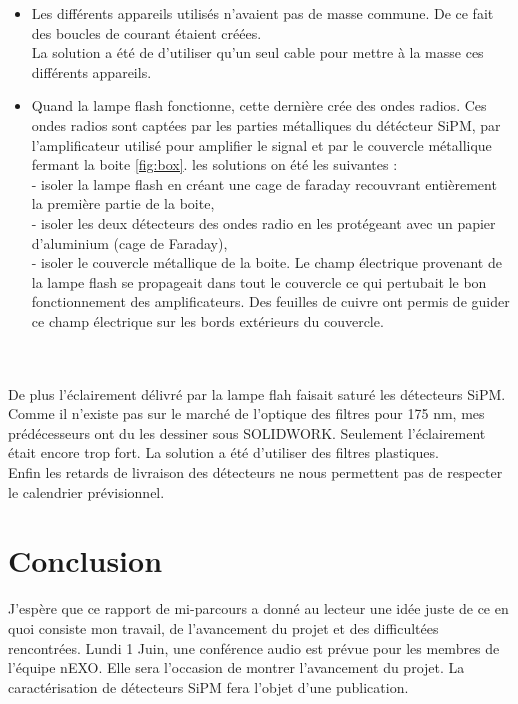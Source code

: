 \documentclass[a4paper, 11pt]{report}%
\begin{document}
  \begin{itemize}
    \item Les diff\'erents appareils utilis\'es n'avaient pas de masse commune. De ce fait des boucles de courant \'etaient cr\'e\'ees. 
    \\
    La solution a \'et\'e de d'utiliser qu'un seul cable pour mettre \`a la masse ces diff\'erents appareils. 
    \item Quand la lampe flash fonctionne, cette derni\`ere cr\'ee des ondes radios. Ces ondes radios sont capt\'ees par les parties m\'etalliques du d\'et\'ecteur SiPM,
    par l'amplificateur utilis\'e pour amplifier le signal et par le couvercle m\'etallique fermant la boite \ref{fig:box}.
    les solutions on \'et\'e les suivantes : 
    \\- isoler la lampe flash en cr\'eant une cage de faraday recouvrant enti\`erement la premi\`ere partie de la boite, 
    \\- isoler les deux d\'etecteurs des ondes radio en les prot\'egeant avec un papier d'aluminium (cage de Faraday), 
    \\- isoler le couvercle m\'etallique de la boite. Le champ \'electrique provenant de la lampe flash se propageait dans tout le couvercle ce qui pertubait
    le bon fonctionnement des amplificateurs. Des feuilles de cuivre ont permis de guider ce champ \'electrique sur les bords ext\'erieurs du couvercle. 
  \end{itemize}
  \hspace{1cm}\\ \\
  
  De plus l'\'eclairement d\'elivr\'e par la lampe flah faisait satur\'e les d\'etecteurs SiPM. Comme il n'existe pas sur le march\'e de l'optique des filtres 
  pour 175 nm, mes pr\'ed\'ecesseurs ont du les dessiner sous SOLIDWORK. Seulement l'\'eclairement \'etait encore trop fort. La solution a \'et\'e d'utiliser 
  des filtres plastiques. 
  \\
  
  Enfin les retards de livraison des d\'etecteurs ne nous permettent pas de respecter le calendrier pr\'evisionnel. 

\section{Conclusion}

  J'esp\`ere que ce rapport de mi-parcours a donn\'e au lecteur une id\'ee juste de ce en quoi consiste mon travail, de l'avancement du projet et des difficult\'ees
  rencontr\'ees. 
  Lundi 1 Juin, une conf\'erence audio est pr\'evue pour les membres de l'\'equipe nEXO. Elle sera l'occasion de montrer l'avancement du projet. 
  La caract\'erisation de d\'etecteurs SiPM fera l'objet d'une publication. 
\end{document}
